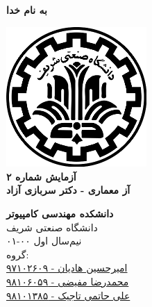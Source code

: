 \documentclass{article}
\begin{document}
\begin{titlepage}
	\begin{center}
		\textbf{ \Huge{به نام خدا}}
	
		\vspace{0.2cm}
		
		\includegraphics[width=0.4\textwidth]{sharif.png}\\
		\vspace{0.2cm}
		\textbf{ \Huge{آزمایش شماره ۲}}\\
		\vspace{0.25cm}
		\textbf{ \Large{آز معماری - دکتر سربازی آزاد}}
		\vspace{0.2cm}
		
		
		\large \textbf{دانشکده مهندسی کامپیوتر}\\\vspace{0.1cm}
		\large   دانشگاه صنعتی شریف\\\vspace{0.2cm}
		\large   ﻧﯿﻢ‌سال اول ۰۰-۰۱ \\\vspace{0.10cm}
		\large{گروه:}\\
		\large{\href{mailto:a.h.hadian@gmail.com}{امیرحسین هادیان - ۹۷۱۰۲۶۰۹}}\\
		\large{\href{mailto:mofayezi.m@gmail.com}{محمدرضا مفیضی - ۹۸۱۰۶۰۵۹}}\\
		\large{\href{mailto:a.hatam008@gmail.com}{علی حاتمی تاجیک - ۹۸۱۰۱۳۸۵}}\\
	\end{center}
\end{titlepage}

\newpage

\pagestyle{fancy}
\fancyhf{}
\fancyfoot{}
\setlength{\headheight}{59pt}
\cfoot{\thepage}
\end{document}
